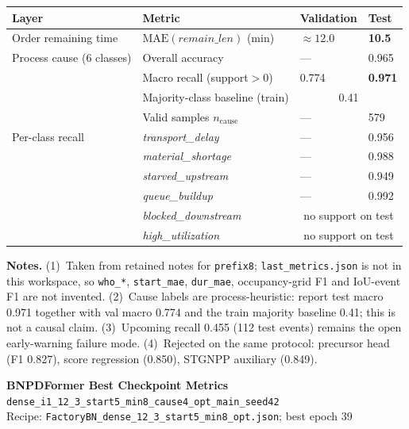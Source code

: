 \documentclass[10pt,a4paper]{article}
\begin{document}
\begin{center}
\begin{tabular}{l l l l}
\toprule
Layer & Metric & Validation & Test \\
\midrule
Order remaining time
  & $\mathrm{MAE}(\textit{remain\_len})$ (min)
  & $\approx 12.0$
  & \textbf{10.5} \\
\midrule
Process cause (6 classes)
  & Overall accuracy
  & ---
  & 0.965 \\
  & Macro recall (support${>}0$)
  & 0.774
  & \textbf{0.971} \\
  & Majority-class baseline (train)
  & \multicolumn{2}{c}{0.41} \\
  & Valid samples $n_{\mathrm{cause}}$
  & ---
  & 579 \\
\midrule
Per-class recall
  & \textit{transport\_delay}
  & --- & 0.956 \\
  & \textit{material\_shortage}
  & --- & 0.988 \\
  & \textit{starved\_upstream}
  & --- & 0.949 \\
  & \textit{queue\_buildup}
  & --- & 0.992 \\
  & \textit{blocked\_downstream}
  & \multicolumn{2}{c}{no support on test} \\
  & \textit{high\_utilization}
  & \multicolumn{2}{c}{no support on test} \\
\bottomrule
\end{tabular}
\end{center}

\small
\textbf{Notes.}
(1)~Taken from retained notes for \texttt{prefix8}; \texttt{last\_metrics.json} is not in this workspace, so \texttt{who\_*}, \texttt{start\_mae}, \texttt{dur\_mae}, occupancy-grid F1 and IoU-event F1 are not invented.
(2)~Cause labels are process-heuristic: report test macro 0.971 together with val macro 0.774 and the train majority baseline 0.41; this is not a causal claim.
(3)~Upcoming recall 0.455 (112 test events) remains the open early-warning failure mode.
(4)~Rejected on the same protocol: precursor head (F1 0.827), score regression (0.850), STGNPP auxiliary (0.849).

\clearpage
\begin{center}
{\LARGE\bfseries BNPDFormer Best Checkpoint Metrics}\\[3pt]
{\large\texttt{dense\_i1\_12\_3\_start5\_min8\_cause4\_opt\_main\_seed42}}\\[2pt]
{\normalsize Recipe: \texttt{FactoryBN\_dense\_12\_3\_start5\_min8\_opt.json}; best epoch 39}
\end{center}
\end{document}
